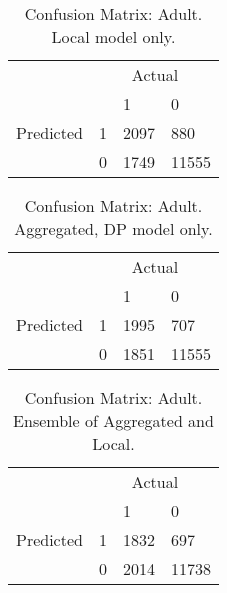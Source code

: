 \begin{table}[h]
	\centering
	\begin{tabular}{llll}
		& \multicolumn{3}{c}{Actual}                                                      \\
		\multicolumn{1}{c}{} &                        & 1                         & 0                          \\ \cline{3-4} 
		Predicted            & \multicolumn{1}{l|}{1} & \multicolumn{1}{l|}{2097} & \multicolumn{1}{l|}{880}   \\ \cline{3-4} 
		& \multicolumn{1}{l|}{0} & \multicolumn{1}{l|}{1749} & \multicolumn{1}{l|}{11555} \\ \cline{3-4} 
	\end{tabular}
	\caption{Confusion Matrix: Adult. Local model only.}
	\label{fig:confmat_adult_local}
\end{table}

\begin{table}[h]
	\centering
	\begin{tabular}{llll}
		& \multicolumn{3}{c}{Actual}                                                      \\
		\multicolumn{1}{c}{} &                        & 1                         & 0                          \\ \cline{3-4} 
		Predicted            & \multicolumn{1}{l|}{1} & \multicolumn{1}{l|}{1995} & \multicolumn{1}{l|}{707}   \\ \cline{3-4} 
		& \multicolumn{1}{l|}{0} & \multicolumn{1}{l|}{1851} & \multicolumn{1}{l|}{11555} \\ \cline{3-4} 
	\end{tabular}
		\caption{Confusion Matrix: Adult. Aggregated, DP model only.}
		\label{fig:confmat_adult_aggdp}
\end{table}

\begin{table}[h]
	\centering
	\begin{tabular}{llll}
		& \multicolumn{3}{c}{Actual} \\
		\multicolumn{1}{c}{} &                        & 1                         & 0                          \\ \cline{3-4} 
		Predicted            & \multicolumn{1}{l|}{1} & \multicolumn{1}{l|}{1832} & \multicolumn{1}{l|}{697}   \\ \cline{3-4} 
		& \multicolumn{1}{l|}{0} & \multicolumn{1}{l|}{2014} & \multicolumn{1}{l|}{11738} \\ \cline{3-4} 
	\end{tabular}
		\caption{Confusion Matrix: Adult. Ensemble of Aggregated and Local.}
		\label{fig:confmat_adult_ensemble}
\end{table}

